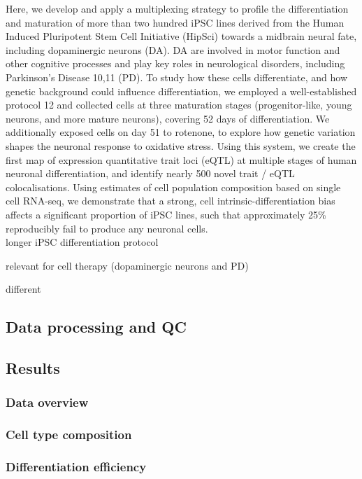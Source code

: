 Here, we develop and apply a multiplexing strategy to profile the differentiation and maturation of more than two hundred iPSC lines derived from the Human Induced Pluripotent Stem Cell Initiative (HipSci) towards a midbrain neural fate, including dopaminergic neurons (DA). 
DA are involved in motor function and other cognitive processes and play key roles in neurological disorders, including Parkinson’s Disease 10,11 (PD). 
To study how these cells differentiate, and how genetic background could influence differentiation, we employed a well-established protocol 12 and collected cells at three maturation stages (progenitor-like, young neurons, and more mature neurons), covering 52 days of differentiation. 
We additionally exposed cells on day 51 to rotenone, to explore how genetic variation shapes the neuronal response to oxidative stress. 
Using this system, we create the first map of expression quantitative trait loci (eQTL) at multiple stages of human neuronal differentiation, and identify nearly 500 novel trait / eQTL colocalisations. 
Using estimates of cell population composition based on single cell RNA-seq, we demonstrate that a strong, cell intrinsic-differentiation bias affects a significant proportion of iPSC lines, such that approximately 25\% reproducibly fail to produce any neuronal cells.\\

longer iPSC differentiation protocol

relevant for cell therapy (dopaminergic neurons and PD)

different 

\subsection{Data processing and QC}

\subsection{Results}

\subsubsection{Data overview}

\subsubsection{Cell type composition}

\subsubsection{Differentiation efficiency}

